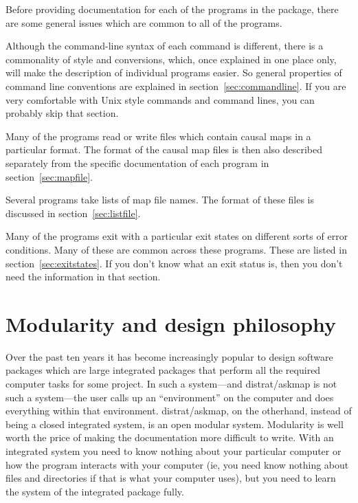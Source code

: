 \documentclass[%
	11pt,
        a4paper,
        twoside]{workrep}
\newcommand*{\prg}[1]{\textsf{#1}}		%
\newcommand*{\scare}[1]{{``}#1\/{''}}		%
\newcommand{\dram}{\prg{distrat}/\prg{askmap}\xspace}	%
\newcommand{\dash}{---}
\begin{document}
Before providing documentation for each of the programs in the
package, there are some general issues which are common to all of the
programs.

Although the command-line syntax of each command is different, there
is a commonality of style and conversions, which, once explained in
one place only, will make the description of individual programs
easier.  So general properties of command line conventions are
explained in section~\ref{sec:commandline}.  If you are very
comfortable with Unix style commands and command lines, you can
probably skip that section.

Many of the programs read or write files which contain causal maps in
a particular format.  The format of the causal map files is then also
described separately from the specific documentation of each program
in section~\ref{sec:mapfile}.

Several programs take lists of map file names.  The format of these
files is discussed in section~\ref{sec:listfile}.

Many of the programs exit with a particular exit states on different
sorts of error conditions.  Many of these are common across these
programs.  These are listed in section~\ref{sec:exitstates}.  If you
don't know what an exit status is, then you don't need the
information in that section.

\section{Modularity and design philosophy} \label{sec:modularity}

Over the past ten years it has become increasingly popular to design
software packages which are large integrated packages that perform
all the required computer tasks for some project.  In such a
system\dash and \dram is not such a system\dash the user calls up an
\scare{environment} on the computer and does everything within that
environment.  \dram, on the otherhand, instead of being a closed
integrated system, is an open modular system.  Modularity is well
worth the price of making the documentation more difficult to write.
With an integrated system you need to know nothing about your
particular computer or how the program interacts with your computer
(ie, you need know nothing about files and directories if that is what
your computer uses), but you need to learn the system of the
integrated package fully.
\end{document}
